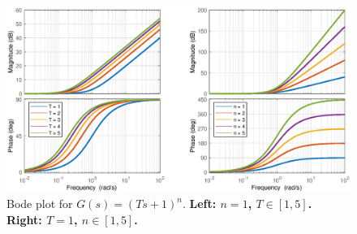 \begin{figure}
    \centering
    \includegraphics[width=\textwidth]{images/bode2.eps}
    \caption{Bode plot for $G(s) = (Ts+1)^{n}$. \textbf{Left: $n=1$, $T\in [1,5]$. Right: $T=1$, $n\in [1,5]$.}}
\end{figure}

